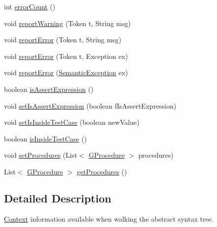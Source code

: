\begin{DoxyCompactItemize}
\item 
int \hyperlink{classorg_1_1tzi_1_1use_1_1parser_1_1_context_a00a5801e9415e71b90a15daba6eda746}{error\-Count} ()
\item 
void \hyperlink{classorg_1_1tzi_1_1use_1_1parser_1_1_context_a03f6df6f080d69b6142badc2669d3466}{report\-Warning} (Token t, String msg)
\item 
void \hyperlink{classorg_1_1tzi_1_1use_1_1parser_1_1_context_aec8de861ebe7f12ed6169cb0c48656e1}{report\-Error} (Token t, String msg)
\item 
void \hyperlink{classorg_1_1tzi_1_1use_1_1parser_1_1_context_ae4dcf10c71cbe67610e2677a2d94b250}{report\-Error} (Token t, Exception ex)
\item 
void \hyperlink{classorg_1_1tzi_1_1use_1_1parser_1_1_context_a201d8c5d9f972763974bed6e546e7b79}{report\-Error} (\hyperlink{classorg_1_1tzi_1_1use_1_1parser_1_1_semantic_exception}{Semantic\-Exception} ex)
\item 
boolean \hyperlink{classorg_1_1tzi_1_1use_1_1parser_1_1_context_a98961b9b7e13fee7ac93453d2dd0ff81}{is\-Assert\-Expression} ()
\item 
void \hyperlink{classorg_1_1tzi_1_1use_1_1parser_1_1_context_ad00e52af9e9f084009c8f8404508d615}{set\-Is\-Assert\-Expression} (boolean f\-Is\-Assert\-Expression)
\item 
void \hyperlink{classorg_1_1tzi_1_1use_1_1parser_1_1_context_ac02b1b78809540b7f73040b55f2e2c5b}{set\-Is\-Inside\-Test\-Case} (boolean new\-Value)
\item 
boolean \hyperlink{classorg_1_1tzi_1_1use_1_1parser_1_1_context_ae90782cc805fe2d607fc224731e5f284}{is\-Inside\-Test\-Case} ()
\item 
void \hyperlink{classorg_1_1tzi_1_1use_1_1parser_1_1_context_ac4ccbb26d29484c5025711981b5385b2}{set\-Procedures} (List$<$ \hyperlink{classorg_1_1tzi_1_1use_1_1gen_1_1assl_1_1statics_1_1_g_procedure}{G\-Procedure} $>$ procedures)
\item 
List$<$ \hyperlink{classorg_1_1tzi_1_1use_1_1gen_1_1assl_1_1statics_1_1_g_procedure}{G\-Procedure} $>$ \hyperlink{classorg_1_1tzi_1_1use_1_1parser_1_1_context_a23cfcb856cb46d459f6c8a5d3fb80254}{get\-Procedures} ()
\end{DoxyCompactItemize}


\subsection{Detailed Description}
\hyperlink{classorg_1_1tzi_1_1use_1_1parser_1_1_context}{Context} information available when walking the abstract syntax tree.

